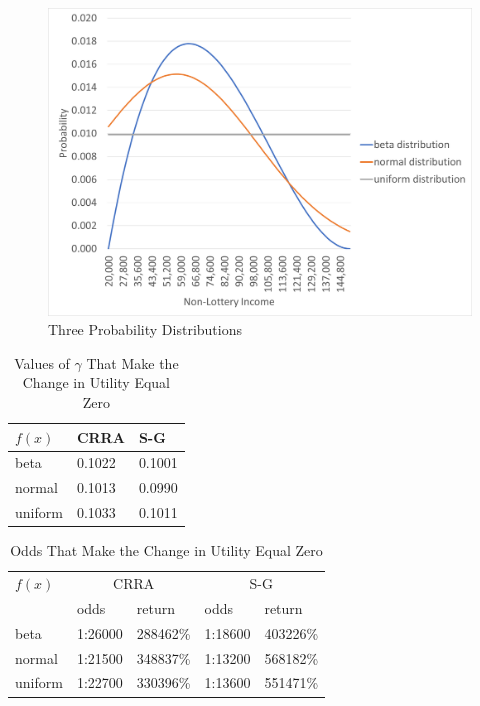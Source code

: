 \documentclass[letterpaper,12pt]{article}
\numberwithin{equation}{section}
\numberwithin{figure}{section}
\numberwithin{table}{section}
\begin{document}
\begin{spacing}{1.5}
	\begin{figure}[ht] 
		\centering
		\caption{Three Probability Distributions}
		\label{fig_PDFs}
		\includegraphics[width=.9\textwidth]{images/PDFs.png}
	\end{figure}

	\begin{table}[ht] 
		\caption{Values of $\gamma$ That Make the Change in Utility Equal Zero}
		\label{tab_lottery2}
		\centering
		\begin{tabular}{|l|ll|}
		    \hline
			$f(x)$ & CRRA & S-G \\
			\hline
			beta & 0.1022 & 0.1001 \\
			normal & 0.1013 & 0.0990 \\
			uniform & 0.1033 & 0.1011 \\
			\hline
		\end{tabular}
	\end{table}

	\begin{table}[ht] 
		\caption{Odds That Make the Change in Utility Equal Zero}
		\label{tab_lottery3}
		\centering
		\begin{tabular}{|l|ll|ll|}
		    \hline
			$f(x)$ & \multicolumn{2}{c}{CRRA} & \multicolumn{2}{c}{S-G} \\
			& odds & return & odds & return \\
			\hline
			beta & 1:26000 & 288462\% & 1:18600 & 403226\% \\
			normal & 1:21500 & 348837\% & 1:13200 & 568182\% \\
			uniform & 1:22700 & 330396\% & 1:13600 & 551471\% \\
			\hline
		\end{tabular}
	\end{table}



\end{spacing}
\end{document}
